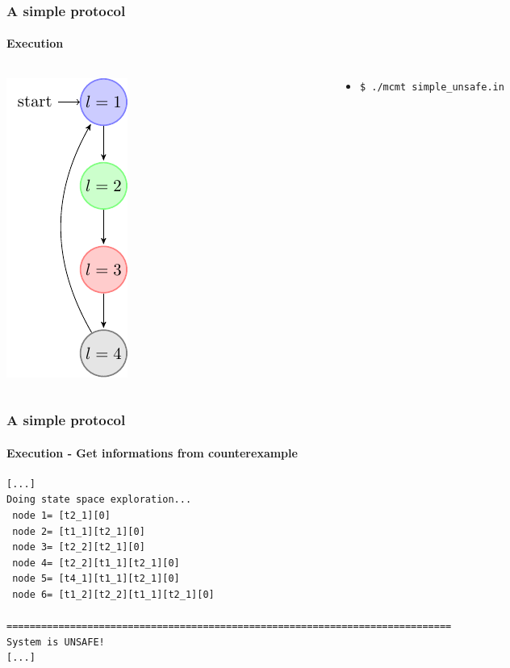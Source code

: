 \begin{frame}[fragile]
  \frametitle{A simple protocol}
  \framesubtitle{Execution}

  \begin{columns}
  \begin{column}{0.3\textwidth}
  \centering
  \includegraphics{pictures/demo-prot1-fig}
  \end{column}
  \begin{column}{0.7\textwidth}
  
  \begin{itemize}
    \item {\tt \$ ./mcmt simple\_unsafe.in}
  \end{itemize}

\end{column}

\end{columns}  

\end{frame}




\begin{frame}[fragile]
  \frametitle{A simple protocol}
  \framesubtitle{Execution - Get informations from counterexample}

{\scriptsize
\begin{verbatim}
[...]
Doing state space exploration...
 node 1= [t2_1][0]  
 node 2= [t1_1][t2_1][0]  
 node 3= [t2_2][t2_1][0]  
 node 4= [t2_2][t1_1][t2_1][0]  
 node 5= [t4_1][t1_1][t2_1][0]  
 node 6= [t1_2][t2_2][t1_1][t2_1][0]

=============================================================================
System is UNSAFE!
[...]
\end{verbatim}
}

\end{frame}




